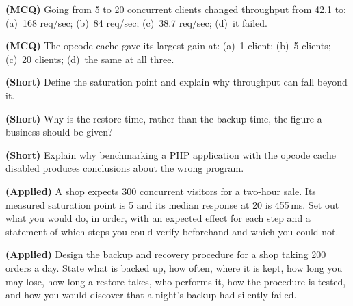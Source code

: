 \begin{reviewq}
  \item \textbf{(MCQ)} Going from 5 to 20 concurrent clients changed throughput
        from 42.1 to: (a)~168 req/sec; (b)~84 req/sec; (c)~38.7 req/sec;
        (d)~it failed.
  \item \textbf{(MCQ)} The opcode cache gave its largest gain at: (a)~1 client;
        (b)~5 clients; (c)~20 clients; (d)~the same at all three.
  \item \textbf{(Short)} Define the saturation point and explain why throughput
        can fall beyond it.
  \item \textbf{(Short)} Why is the restore time, rather than the backup time,
        the figure a business should be given?
  \item \textbf{(Short)} Explain why benchmarking a PHP application with the
        opcode cache disabled produces conclusions about the wrong program.
  \item \textbf{(Applied)} A shop expects 300 concurrent visitors for a
        two-hour sale. Its measured saturation point is 5 and its median
        response at 20 is 455\,ms. Set out what you would do, in order, with an
        expected effect for each step and a statement of which steps you could
        verify beforehand and which you could not.
  \item \textbf{(Applied)} Design the backup and recovery procedure for a shop
        taking 200 orders a day. State what is backed up, how often, where it
        is kept, how long you may lose, how long a restore takes, who performs
        it, how the procedure is tested, and how you would discover that a
        night's backup had silently failed.
\end{reviewq}
